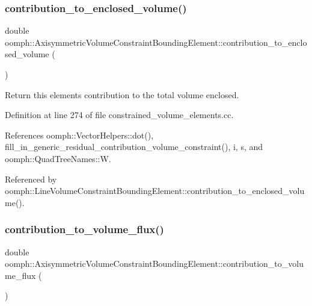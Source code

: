 \subsubsection{\texorpdfstring{contribution\+\_\+to\+\_\+enclosed\+\_\+volume()}{contribution\_to\_enclosed\_volume()}}
{\footnotesize\ttfamily double oomph\+::\+Axisymmetric\+Volume\+Constraint\+Bounding\+Element\+::contribution\+\_\+to\+\_\+enclosed\+\_\+volume (\begin{DoxyParamCaption}{ }\end{DoxyParamCaption})}



Return this element\textquotesingle{}s contribution to the total volume enclosed. 



Definition at line 274 of file constrained\+\_\+volume\+\_\+elements.\+cc.



References oomph\+::\+Vector\+Helpers\+::dot(), fill\+\_\+in\+\_\+generic\+\_\+residual\+\_\+contribution\+\_\+volume\+\_\+constraint(), i, s, and oomph\+::\+Quad\+Tree\+Names\+::W.



Referenced by oomph\+::\+Line\+Volume\+Constraint\+Bounding\+Element\+::contribution\+\_\+to\+\_\+enclosed\+\_\+volume().

\mbox{\label{classoomph_1_1AxisymmetricVolumeConstraintBoundingElement_a746f88f325d61610e10e97465fd2ca09}} 
\subsubsection{\texorpdfstring{contribution\+\_\+to\+\_\+volume\+\_\+flux()}{contribution\_to\_volume\_flux()}}
{\footnotesize\ttfamily double oomph\+::\+Axisymmetric\+Volume\+Constraint\+Bounding\+Element\+::contribution\+\_\+to\+\_\+volume\+\_\+flux (\begin{DoxyParamCaption}{ }\end{DoxyParamCaption})\hspace{0.3cm}{\ttfamily [inline]}}



